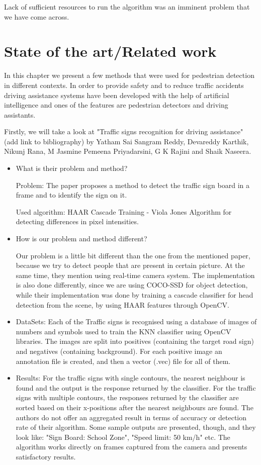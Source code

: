 \documentclass[runningheads,a4paper,11pt]{report}
\begin{document}
Lack of sufficient resources to run the algorithm was an imminent problem that we have come across.



\chapter{State of the art/Related work}
\label{chapter:stateOfArt}

In this chapter we present a few methods that were used for pedestrian detection in different contexts. In order to provide safety and to reduce traffic accidents driving assistance systems have been developed with the help of artificial intelligence and ones of the features are pedestrian detectors and driving assistants.

Firstly, we will take a look at "Traffic signs recognition for driving assistance" (add link to bibliography) by Yatham Sai Sangram Reddy, Devareddy Karthik, Nikunj Rana, M Jasmine Pemeena Priyadarsini, G K Rajini
and Shaik Naseera.
\begin{itemize}
	\item What is their problem and method?
	
	Problem: The paper proposes a method to detect the traffic sign board in a frame and to identify the sign on it. 
	
	Used algorithm: HAAR Cascade Training - Viola Jones Algorithm for detecting differences in pixel intensities.
	\item How is our problem and method different? 
	
	Our problem is a little bit different than the one from the mentioned paper, because we try to detect people that are present in certain picture. At the same time, they mention using real-time camera system. The implementation is also done differently, since we are using COCO-SSD for object detection, while their implementation was done by training a cascade classifier for head detection from the scene, by using HAAR features through OpenCV.
	\item DataSets: Each of the Traffic signs is recognised using a database of images of numbers and symbols used to train the KNN classifier using OpenCV libraries. The images are split into positives (containing the target road sign) and negatives (containing background). For each positive image an annotation file is created, and then a vector (.vec) file for all of them.
	\item Results: For the traffic signs with single contours, the nearest neighbour is found and the output is the response returned by the classifier. For the traffic signs with multiple contours, the responses returned by the classifier are sorted based on their x-positions after the
    nearest neighbours are found. The authors do not offer an aggregated result in terms of accuracy or detection rate of their algorithm. Some sample outputs are presented, though, and they look like: "Sign Board: School Zone", "Speed limit: 50 km/h" etc. The algorithm works directly on frames captured from the camera and presents satisfactory results.
    
\end{itemize}
\end{document}
